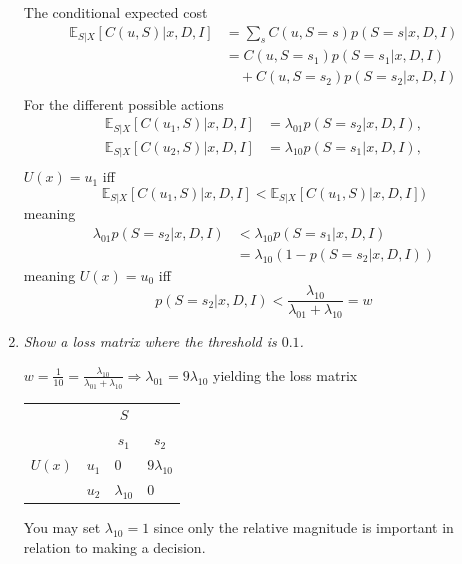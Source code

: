 \begin{example}
\begin{enumerate}
		The conditional expected cost
		\begin{equation}
			\begin{split}
				\mathbb{E}_{S|X}[C(u, S)|x,D,I] & = \sum_sC(u,S=s)p(S=s|x,D,I)\\
				& = C(u,S=s_1)p(S=s_1|x,D,I)\\
				& \quad+C(u,S=s_2)p(S=s_2|x,D,I)\\
			\end{split}
		\end{equation}
		For the different possible actions
		\begin{equation}
			\begin{split}
				\mathbb{E}_{S|X}[C(u_1, S)|x,D,I] &= \lambda_{01}p(S=s_2|x,D,I),\\
				\mathbb{E}_{S|X}[C(u_2, S)|x,D,I] &= \lambda_{10}p(S=s_1|x,D,I),\\
			\end{split}
		\end{equation}
		$U(x)=u_1$ iff
		\begin{equation}
			\mathbb{E}_{S|X}[C(u_1,S)|x,D,I]<\mathbb{E}_{S|X}[C(u_1,S)|x,D,I])
		\end{equation}
		meaning
		\begin{equation}
			\begin{split}
				\lambda_{01}p(S=s_2|x,D,I)&<\lambda_{10}p(S = s_1|x,D,I)\\
				&=\lambda_{10}(1-p(S =s_2|x,D,I))
			\end{split}
		\end{equation}
		meaning $U(x) = u_0$ iff
		\begin{equation}
			p(S=s_2|x,D,I)<\frac{\lambda_{10}}{\lambda_{01}+\lambda_{10}}=w
		\end{equation}
		
		
		\item \emph{Show a loss matrix where the threshold is $0.1$.}\newline
		
		$w = \frac{1}{10}=\frac{\lambda_{10}}{\lambda_{01}+\lambda_{10}} \Rightarrow \lambda_{01}=9\lambda_{10}$ yielding the loss matrix
		
		\begin{center}
			\begin{tabular}{ c  c  c  c }
				&& $S$& \\
				&& $s_1$ & $s_2$  \\
				\cline{3-4}
				$U(x)$ & $u_1$& \multicolumn{1}{|l}{$0$} &\multicolumn{1}{l|}{$9\lambda_{10}$}  \\
				& $u_2$& \multicolumn{1}{|l}{$\lambda_{10}$} & \multicolumn{1}{l|}{0} \\
				\cline{3-4}
			\end{tabular}
		\end{center}
		
		You may set $\lambda_{10}=1$ since only the relative magnitude is important in relation to making a decision.
		
	\end{enumerate}
	
	
\end{example}


